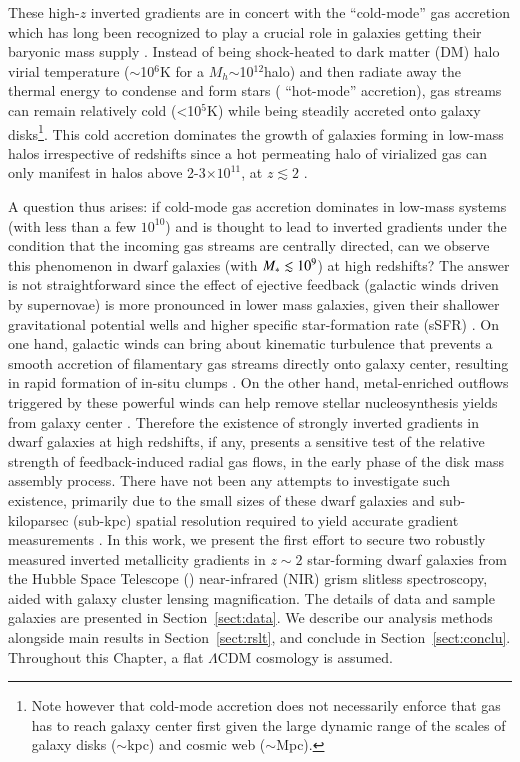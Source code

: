 These high-$z$ inverted gradients are in concert with the ``cold-mode'' gas accretion which has long been recognized to play a
crucial role in galaxies getting their baryonic mass supply
\citep{Birnboim:2003fo,Keres:2005gb,Dekel:2006cn,Dekel:2009fz,2009MNRAS.395..160K}.
Instead of being shock-heated to dark matter (DM) halo virial temperature ($\sim$10$^6$K for a $M_{
h}$$\sim$10$^{12}$\Msun halo) and then radiate away the thermal energy to condense and form stars (\vsv 
``hot-mode'' accretion),
gas streams can remain relatively cold (<10$^5$K) while being steadily accreted onto galaxy 
disks\footnote{Note however that
cold-mode accretion does not necessarily enforce that gas has to reach galaxy center first
given the large dynamic range of the scales of galaxy disks ($\sim$kpc) and cosmic web ($\sim$Mpc).}.
This cold accretion dominates the growth of galaxies forming in low-mass halos irrespective of redshifts since a hot permeating
halo of virialized gas can only manifest in halos above 2-3$\times10^{11}$\Msun, at $z\lesssim2$
\citep{Birnboim:2003fo,Keres:2005gb}.

A question thus arises: if cold-mode gas accretion dominates in low-mass systems (with \Mstar less than a few
$10^{10}$\Msun) and is thought to lead to inverted gradients under the condition that the incoming gas streams 
are centrally directed, can we observe this phenomenon in dwarf galaxies (with $M_\ast\lesssim10^9$) at high 
redshifts?
The answer is not straightforward since the effect of ejective feedback (\eg galactic winds driven by supernovae) is more
pronounced in lower mass galaxies, given their shallower gravitational potential wells and higher specific
star-formation rate (sSFR) \citep[see \eg][]{GalaxiesonFIREFe:2014dn,2014Natur.509..177V}.
On one hand, galactic winds can bring about kinematic turbulence that prevents a smooth accretion of 
filamentary gas streams directly onto galaxy center, resulting in rapid formation of in-situ clumps 
\citep{Dekel:2009bn}.
On the other hand, metal-enriched outflows triggered by these powerful winds can help remove stellar nucleosynthesis yields from
galaxy center \citep{Tremonti:2004ed,Erb:2006kn}.
Therefore the existence of strongly inverted gradients in dwarf galaxies at high redshifts, if any, presents a sensitive test of 
the relative strength of feedback-induced radial gas flows, in the early phase of the disk mass assembly process.
There have not been any attempts to investigate such existence, primarily due to the small sizes of these 
dwarf galaxies and sub-kiloparsec (sub-kpc) spatial resolution required to yield accurate gradient 
measurements \citep{2013ApJ...767..106Y}.
In this work, we present the first effort to secure two robustly measured inverted metallicity gradients in $z\sim2$ star-forming
dwarf galaxies from the Hubble Space Telescope (\hst) near-infrared (NIR) grism slitless spectroscopy, aided 
with galaxy cluster lensing magnification.
The details of data and sample galaxies are presented in Section~\ref{sect:data}. We describe our analysis methods alongside main 
results in Section~\ref{sect:rslt}, and conclude in Section~\ref{sect:conclu}.
Throughout this Chapter, a flat $\Lambda$CDM cosmology is assumed.


